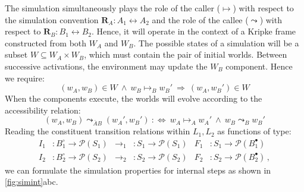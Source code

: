 \documentclass[acmsmall,screen,review,anonymous]{acmart}
\newcommand{\que}{\circ}
\newcommand{\ans}{\bullet}
\begin{document}
The simulation simultaneously
plays the role of the caller ($\mapsto$) with respect to
the simulation convention $\mathbf{R}_A : A_1 \leftrightarrow A_2$ and
the role of the callee ($\leadsto$) with respect to $\mathbf{R}_B : B_1 \leftrightarrow B_2$.
Hence,
it will operate in the context of a Kripke frame
constructed from both $W_A$ and $W_B$.
The possible states of a simulation will be a subset
$W \subseteq W_A \times W_B$,
which must contain
the pair of initial worlds.
Between successive activations,
the environment may update the $W_B$ component.
Hence we require:
\[
  (w_A, w_B) \in W \:\wedge\:
  w_B \mapsto_B w_B' \:\Rightarrow\:
  (w_A, w_B') \in W
\]
When the components execute,
the worlds will evolve according to
the accessibility relation:
\[
  (w_A, w_B) \leadsto_{\bar{A}B} (w_A', w_B') \::\Leftrightarrow\:
  w_A \mapsto_A w_A' \:\wedge\: w_B \leadsto_B w_B'
\]
Reading the constituent transition relations
within $L_1, L_2$ as functions of type:
\begin{align*}
  I_1 &: B_1^\que \rightarrow \mathcal{P}(S_1) &
  {\rightarrow_1} &: S_1 \rightarrow \mathcal{P}(S_1) &
  F_1 &: S_1 \rightarrow \mathcal{P}(B_1^\ans)
  \\
  I_2 &: B_2^\que \rightarrow \mathcal{P}(S_2) &
  {\rightarrow_2} &: S_2 \rightarrow \mathcal{P}(S_2) &
  F_2 &: S_2 \rightarrow \mathcal{P}(B_2^\ans)
  \,,
\end{align*}
we can formulate the simulation properties for internal steps
as shown in \autoref{fig:simint}abc.
\end{document}
